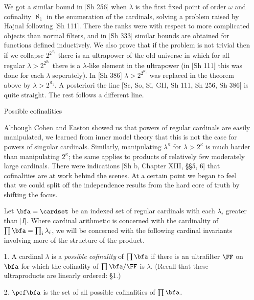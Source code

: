 We got a similar bound in [Sh 256] when $\lambda$ is the 
first fixed
point of order $\omega$ and cofinality $\aleph_1$ in the 
enumeration
of the cardinals, solving a problem raised by Hajnal 
following [Sh
111]. There the ranks were with respect to more
complicated objects than normal filters, and in [Sh 333] 
similar
bounds are obtained for functions defined inductively.
We also prove that if the problem is not trivial then
if we collapse $2^{2^{\aleph_1}}$ there is an ultrapower 
of the
old universe in which for all regular 
$\lambda>2^{2^{\aleph_1}}$ there
is a $\lambda$-like element in the ultrapower (in [Sh 111] 
this was
done for each $\lambda$ seperately). In [Sh 386]
$\lambda>2^{2^{\aleph_1}}$ was replaced in the theorem 
above by
$\lambda > 2^{\aleph_1}$. A posteriori the line [Sc,
So, Si, GH, Sh 111, Sh 256, Sh 386] is quite straight.
The rest follows a different line.
 
 
{}  Possible  cofinalities\endheading
 
Although Cohen and Easton showed us that powers of regular 
cardinals
are easily manipulated, we learned from inner model theory 
that this
is not the case for powers of singular cardinals.  
Similarly,
manipulating $\lambda^\kappa$ for $\lambda >2^\kappa$ is 
much harder
than manipulating $2^\kappa$; the same applies to products 
of
relatively few moderately large cardinals.  There were 
indications
[Sh b, Chapter XIII, \S\S5, 6] that cofinalities are at 
work behind
the scenes.  At a certain point we began to feel that we 
could split
off
the independence results from the hard core of truth by
 shifting the focus.
 
Let $\bfa =\cardset$ be an indexed  set of regular 
cardinals with each
$\lambda_i$ greater than $|I|$.  Where cardinal arithmetic 
is
concerned with the cardinality of $\prod \bfa=\prod_i 
\lambda_i$, we
will be  concerned with the following cardinal invariants 
involving more of the
 structure
of the product.
 
1. A cardinal $\lambda$ is a {\it possible cofinality\/} of
$\prod \bfa$ if there is an ultrafilter $\FF$ on $\bfa$ 
for which the
cofinality of $\prod \bfa/\FF$ is $\lambda$. (Recall that 
these
ultraproducts are linearly ordered: \S1.)

2. $\pcf \bfa$ is the set of all
possible cofinalities of
$\prod \bfa$.
 
